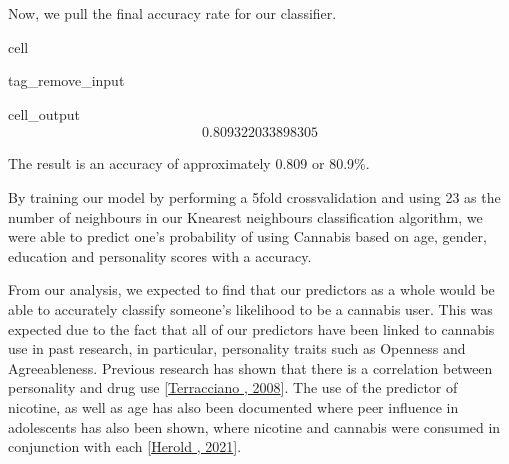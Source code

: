 \documentclass[letterpaper,10pt,english]{jupyterBook}
\begin{document}
\sphinxAtStartPar
Now, we pull the final accuracy rate for our classifier.

\begin{sphinxuseclass}{cell}
\begin{sphinxuseclass}{tag_remove_input}\begin{sphinxVerbatimOutput}

\begin{sphinxuseclass}{cell_output}\begin{equation*}
\begin{split}0.809322033898305\end{split}
\end{equation*}
\end{sphinxuseclass}\end{sphinxVerbatimOutput}

\end{sphinxuseclass}
\end{sphinxuseclass}
\sphinxAtStartPar
The result is an accuracy of approximately 0.809 or 80.9\%.

\begin{DUlineblock}{0em}
\item[] 
\end{DUlineblock}

\begin{DUlineblock}{0em}
\item[] 
\end{DUlineblock}

\sphinxAtStartPar
By training our model by performing a 5\sphinxhyphen{}fold cross\sphinxhyphen{}validation and using 23 as the number of neighbours in our K\sphinxhyphen{}nearest neighbours classification algorithm, we were able to predict one’s probability of using Cannabis based on age, gender, education and personality scores with a  accuracy.

\begin{DUlineblock}{0em}
\item[] 
\end{DUlineblock}

\sphinxAtStartPar
From our analysis, we expected to find that our predictors as a whole would be able to accurately classify someone’s likelihood to be a cannabis user. This was expected due to the fact that all of our predictors have been linked to cannabis use in past research, in particular, personality traits such as Openness and Agreeableness. Previous research has shown that there is a correlation between personality and drug use {[}\hyperlink{cite.Cannabis-Use-Prediction_Analysis:id12}{Terracciano , 2008}{]}. The use of the predictor of nicotine, as well as age has also been documented where peer influence in adolescents has also been shown, where nicotine and cannabis were consumed in conjunction with each {[}\hyperlink{cite.Cannabis-Use-Prediction_Analysis:id10}{Herold , 2021}{]}. 
\end{document}
